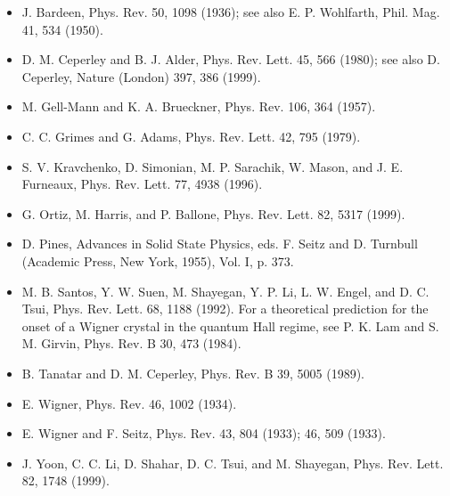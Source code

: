 \begin{itemize}[leftmargin=2em,itemsep=0pt,parsep=0pt,label={}]
\item [B1936] J. Bardeen, Phys. Rev. 50, 1098 (1936); see also E. P. Wohlfarth, Phil. Mag. 41, 534 (1950).
\item [CA1999] D. M. Ceperley and B. J. Alder, Phys. Rev. Lett. 45, 566 (1980); see also D. Ceperley, Nature (London) 397, 386 (1999).
\item [GB1957] M. Gell-Mann and K. A. Brueckner, Phys. Rev. 106, 364 (1957).
\item [G1979] C. C. Grimes and G. Adams, Phys. Rev. Lett. 42, 795 (1979).
\item [K1999] S. V. Kravchenko, D. Simonian, M. P. Sarachik, W. Mason, and J. E. Furneaux, Phys. Rev. Lett. 77, 4938 (1996).
\item [OHB1999] G. Ortiz, M. Harris, and P. Ballone, Phys. Rev. Lett. 82, 5317 (1999).
\item [P1955] D. Pines, Advances in Solid State Physics, eds. F. Seitz and D. Turnbull (Academic Press, New York, 1955), Vol. I, p. 373.
\item [S1992] M. B. Santos, Y. W. Suen, M. Shayegan, Y. P. Li, L. W. Engel, and D. C. Tsui, Phys. Rev. Lett. 68, 1188 (1992). For a theoretical prediction for the onset of a Wigner crystal in the quantum Hall regime, see P. K. Lam and S. M. Girvin, Phys. Rev. B 30, 473 (1984).
\item [TC1989] B. Tanatar and D. M. Ceperley, Phys. Rev. B 39, 5005 (1989).
\item [W1934] E. Wigner, Phys. Rev. 46, 1002 (1934).
\item [WS1933] E. Wigner and F. Seitz, Phys. Rev. 43, 804 (1933); 46, 509 (1933).
\item [Y1999] J. Yoon, C. C. Li, D. Shahar, D. C. Tsui, and M. Shayegan, Phys. Rev. Lett. 82, 1748 (1999).
\end{itemize}

